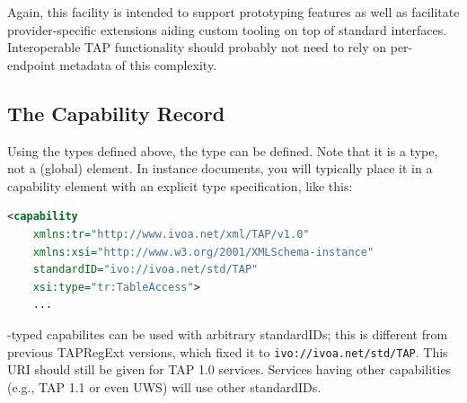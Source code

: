 \documentclass{ivoa}
\begin{document}
Again, this facility is intended to support prototyping features as well
as facilitate provider-specific extensions aiding custom tooling on top
of standard interfaces.  Interoperable TAP functionality should probably
not need to rely on per-endpoint metadata of this complexity.

\subsection{The Capability Record}

\label{caprec}

Using the types defined above, the
 type can be defined.  Note that
it is a type, not a (global) element.  In instance documents, you
will typically place it in a capability element with an explicit
type specification, like this:


\begin{lstlisting}[language=XML,basicstyle=\footnotesize]
  <capability
    xmlns:tr="http://www.ivoa.net/xml/TAP/v1.0"
    xmlns:xsi="http://www.w3.org/2001/XMLSchema-instance"
    standardID="ivo://ivoa.net/std/TAP"
    xsi:type="tr:TableAccess">
    ...
\end{lstlisting}

-typed capabilites can be used with arbitrary
standardIDs; this is different from previous TAPRegExt versions, which
fixed it to \nolinkurl{ivo://ivoa.net/std/TAP}.  This URI should still
be given for TAP 1.0 services.  Services having other capabilities
(e.g., TAP 1.1 or even UWS) will use other standardIDs.
\end{document}
